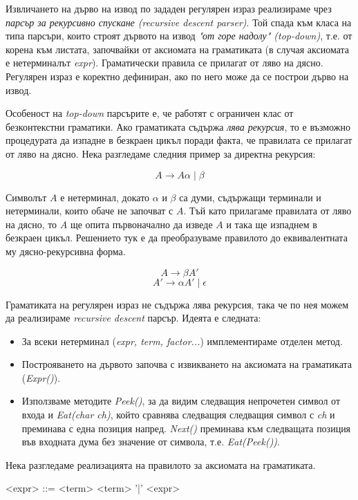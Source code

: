 \documentclass[12pt, oneside]{article}
\theoremstyle{definition}
\begin{document}
Извличането на дърво на извод по зададен регулярен израз реализираме чрез \emph{парсър за рекурсивно спускане (recursive descent parser)}. Той спада към класа на типа парсъри, които строят дървото на извод \emph{"от горе надолу" (top-down)}, т.е. от корена към листата, започвайки от аксиомата на граматиката (в случая аксиомата е нетерминалът \emph{expr}). Граматически правила се прилагат от ляво на дясно. Регулярен израз е коректно дефиниран, ако по него може да се построи дърво на извод.

Особеност на \emph{top-down} парсърите е, че работят с ограничен клас от безконтекстни граматики. Ако граматиката съдържа \emph{лява рекурсия}, то е възможно процедурата да изпадне в безкраен цикъл поради факта, че правилата се прилагат от ляво на дясно. Нека разгледаме следния пример за директна рекурсия:

\[ A \to A \alpha \mid \beta \]

Символът \(A\) е нетерминал, докато \( \alpha \) и \( \beta \) са думи, съдържащи терминали и нетерминали, които обаче не започват с \(A\). Тъй като прилагаме правилата от ляво на дясно, то \(A\) ще опита първоначално да изведе \(A\) и така ще изпаднем в безкраен цикъл. Решението тук е да преобразуваме правилото до еквивалентната му дясно-рекурсивна форма.

\[ A \to \beta A' \]
\[ A' \to \alpha A' \mid \epsilon \]

Граматиката на регулярен израз не съдържа лява рекурсия, така че по нея можем  да реализираме \emph{recursive descent} парсър. Идеята е следната:

\begin{itemize}
	\item За всеки нетерминал (\emph{expr, term, factor...}) имплементираме отделен метод.
	\item Построяването на дървото започва с извикването на аксиомата на граматиката (\emph{Expr()}).
	\item Използваме методите \emph{Peek()}, за да видим следващия непрочетен символ от входа и \emph{Eat(char ch)}, който сравнява следващия следващия символ с \emph{ch} и преминава с една позиция напред. \emph{Next()} преминава към следващата позиция във входната дума без значение от символа, т.е. \emph{Eat(Peek())}.
\end{itemize}

Нека разгледаме реализацията на правилото за аксиомата на граматиката.

\begin{grammar}
	<expr> ::= <term>
	\alt <term> '|' <expr>
\end{grammar}
\end{document}

